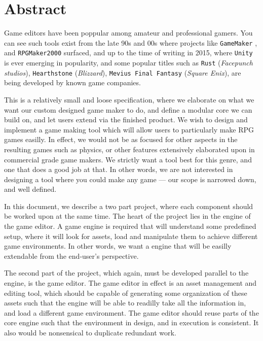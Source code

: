 \section{Abstract}

Game editors have been poppular among amateur and professional gamers. You can
see such tools exist from the late 90s and 00s where projects like
\texttt{GameMaker} \cite{gamemaker}, and \texttt{RPGMaker2000}
\cite{rpgmaker2000} surfaced, and up to the time of writing in 2015, where
\texttt{Unity} is ever emerging in popularity, and some popular titles such as
\texttt{Rust} (\textit{Facepunch studios}), \texttt{Hearthstone}
(\textit{Blizzard}), \texttt{Mevius Final Fantasy} (\textit{Square Enix}), are being
developed by known game companies.

This is a relatively small and loose specification, where we elaborate on what
we want our custom designed game maker to do, and define a modular core we can
build on, and let users extend via the finished product. We wish to design and
implement a game making tool which will allow users to particularly make RPG
games easilly. In effect, we would not be as focused for other aspects in the
resulting games such as physics, or other features extensively elaborated upon
in commercial grade game makers. We strictly want a tool best for this genre,
and one that does a good job at that. In other words, we are not interested in
designing a tool where you could make any game --- our scope is narrowed down,
and well defined.

In this document, we describe a two part project, where each component should be
worked upon at the same time. The heart of the project lies in the engine of the
game editor. A game engine is required that will understand some predefined
setup, where it will look for assets, load and manipulate them to achieve
different game environments. In other words, we want a engine that will be
easilly extendable from the end-user's perspective.

The second part of the project, which again, must be developed parallel to the
engine, is the game editor. The game editor in effect is an asset management
and editing tool, which should be capable of generating some organization of
these assets such that the engine will be able to readilly take all the
information in, and load a different game environment. The game editor should
reuse parts of the core engine such that the environment in design, and in
execution is consistent. It also would be nonsensical to duplicate redundant
work.

